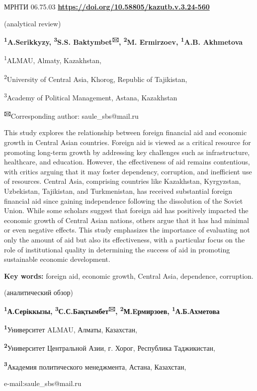 \newpage
МРНТИ 06.75.03
\hfill {\bfseries \href{https://doi.org/10.58805/kazutb.v.3.24-560}{https://doi.org/10.58805/kazutb.v.3.24-560}}


\begin{center}
(analytical review)

{\bfseries \textsuperscript{1}A.Serikkyzy, \textsuperscript{3}S.S.
Baktymbet\textsuperscript{🖂}, \textsuperscript{2}M. Ermirzoev,
\textsuperscript{1}A.B. Akhmetova}

\textsuperscript{1}ALMAU, Almaty, Kazakhstan,

\textsuperscript{2}University of Central Asia, Khorog, Republic of
Tajikistan,

\textsuperscript{3}Academy of Political Management, Astana, Kazakhstan
\end{center}

{\bfseries \textsuperscript{🖂}}Corresponding author: saule\_sbs@mail.ru

This study explores the relationship between foreign financial aid and
economic growth in Central Asian countries. Foreign aid is viewed as a
critical resource for promoting long-term growth by addressing key
challenges such as infrastructure, healthcare, and education. However,
the effectiveness of aid remains contentious, with critics arguing that
it may foster dependency, corruption, and inefficient use of resources.
Central Asia, comprising countries like Kazakhstan, Kyrgyzstan,
Uzbekistan, Tajikistan, and Turkmenistan, has received substantial
foreign financial aid since gaining independence following the
dissolution of the Soviet Union. While some scholars suggest that
foreign aid has positively impacted the economic growth of Central Asian
nations, others argue that it has had minimal or even negative effects.
This study emphasizes the importance of evaluating not only the amount
of aid but also its effectiveness, with a particular focus on the role
of institutional quality in determining the success of aid in promoting
sustainable economic development.

{\bfseries Key words:} foreign aid, economic growth, Central Asia,
dependence, corruption.


\begin{center}
(аналитический обзор)

{\bfseries \textsuperscript{1}А.Серіккызы,
\textsuperscript{3}С.С.Бақтымбет\textsuperscript{🖂},
\textsuperscript{2}М.Eрмирзоев, \textsuperscript{1}А.Б.Ахметова}

{\bfseries \textsuperscript{1}}Университет ALMAU, Алматы, Казахстан,

{\bfseries \textsuperscript{2}}Университет Центральной Азии, г. Хорог,
Республика Таджикистан,

{\bfseries \textsuperscript{3}}Академия политического менеджмента, Астана,
Казахстан,

e-mail:saule\_sbs@mail.ru
\end{center}

